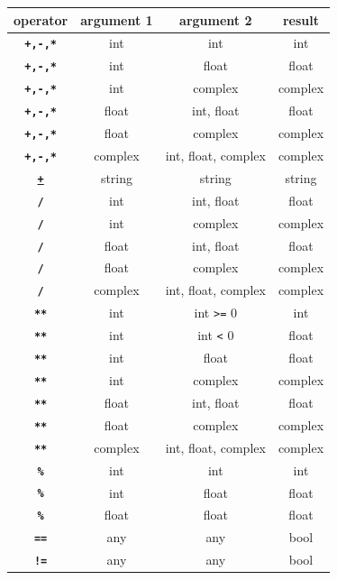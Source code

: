 \begin{center}
\begin{tabular}{c|c|c|c}
operator & argument 1 & argument 2 & result\\ \hline
\texttt{\textbf{+,-,*}} & int       & int       & int\\
\texttt{\textbf{+,-,*}} & int       & float     & float\\
\texttt{\textbf{+,-,*}} & int       & complex   & complex\\
\texttt{\textbf{+,-,*}} & float     & int, float      & float\\
\texttt{\textbf{+,-,*}} & float     & complex   & complex\\
\texttt{\textbf{+,-,*}} & complex   & int, float, complex      & complex\\
\texttt{\href{https://sourceacademy.org/sicpjs/3.3.4\#p24}{\textbf{+}}} & string   & string     & string\\
\texttt{\textbf{/}} & int       & int, float      & float\\
\texttt{\textbf{/}} & int       & complex   & complex\\
\texttt{\textbf{/}} & float     & int, float      & float\\
\texttt{\textbf{/}} & float     & complex   & complex\\
\texttt{\textbf{/}} & complex   & int, float, complex       & complex\\
\texttt{\textbf{**}} & int   & int \verb|>=| 0   & int\\
\texttt{\textbf{**}} & int   & int \verb|<| 0    & float\\
\texttt{\textbf{**}} & int       & float     & float\\
\texttt{\textbf{**}} & int       & complex   & complex\\
\texttt{\textbf{**}} & float     & int, float      & float\\
\texttt{\textbf{**}} & float     & complex   & complex\\
\texttt{\textbf{**}} & complex   & int, float, complex     & complex\\
\texttt{\textbf{\%}} & int   & int   & int\\
\texttt{\textbf{\%}} & int   & float   & float\\
\texttt{\textbf{\%}} & float   & float   & float\\
\texttt{\textbf{==}} & any   & any     & bool\\
\texttt{\textbf{!=}} & any   & any     & bool\\

\end{tabular}
\end{center}

